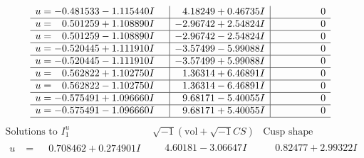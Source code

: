 \documentclass[1p]{elsarticle_modified}
\theoremstyle{definition}
\newcommand{\I}{\sqrt{-1}}
\begin{document}
$$\begin{array}{c|c|c}
\begin{aligned}
u &= -0.481533 - 1.115440 I\end{aligned}
 & \phantom{-}4.18249 + 0.46735 I & \phantom{-0.000000 } 0 \\ \hline\begin{aligned}
u &= \phantom{-}0.501259 + 1.108890 I\end{aligned}
 & -2.96742 + 2.54824 I & \phantom{-0.000000 } 0 \\ \hline\begin{aligned}
u &= \phantom{-}0.501259 - 1.108890 I\end{aligned}
 & -2.96742 - 2.54824 I & \phantom{-0.000000 } 0 \\ \hline\begin{aligned}
u &= -0.520445 + 1.111910 I\end{aligned}
 & -3.57499 - 5.99088 I & \phantom{-0.000000 } 0 \\ \hline\begin{aligned}
u &= -0.520445 - 1.111910 I\end{aligned}
 & -3.57499 + 5.99088 I & \phantom{-0.000000 } 0 \\ \hline\begin{aligned}
u &= \phantom{-}0.562822 + 1.102750 I\end{aligned}
 & \phantom{-}1.36314 + 6.46891 I & \phantom{-0.000000 } 0 \\ \hline\begin{aligned}
u &= \phantom{-}0.562822 - 1.102750 I\end{aligned}
 & \phantom{-}1.36314 - 6.46891 I & \phantom{-0.000000 } 0 \\ \hline\begin{aligned}
u &= -0.575491 + 1.096660 I\end{aligned}
 & \phantom{-}9.68171 - 5.40055 I & \phantom{-0.000000 } 0 \\ \hline\begin{aligned}
u &= -0.575491 - 1.096660 I\end{aligned}
 & \phantom{-}9.68171 + 5.40055 I & \phantom{-0.000000 } 0\\
 \hline 
 \end{array}$$\newpage$$\begin{array}{c|c|c}  
\text{Solutions to }I^u_{1}& \I (\text{vol} + \sqrt{-1}CS) & \text{Cusp shape}\\
 \hline 
\begin{aligned}
u &= \phantom{-}0.708462 + 0.274901 I\end{aligned}
 & \phantom{-}4.60181 - 3.06647 I & \phantom{-}0.82477 + 2.99322 I \\ \hline\begin{aligned}

\end{aligned}
\end{array}$$
\end{document}
